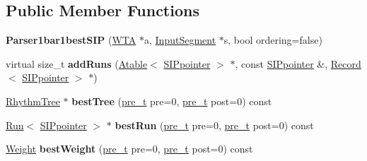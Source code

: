 \subsection*{Public Member Functions}
\begin{DoxyCompactItemize}
\item 
\mbox{\label{classParser1bar1bestSIP_a8827aebf49c21d943c8f61cd96237133}} 
{\bfseries Parser1bar1best\+S\+IP} (\mbox{\hyperlink{classWTA}{W\+TA}} $\ast$a, \mbox{\hyperlink{classInputSegment}{Input\+Segment}} $\ast$s, bool ordering=false)
\item 
\mbox{\label{classParser1bar1bestSIP_a17d10685cd81fb445dc413405be224c1}} 
virtual size\+\_\+t {\bfseries add\+Runs} (\mbox{\hyperlink{classAtable}{Atable}}$<$ \mbox{\hyperlink{classSIPpointer}{S\+I\+Ppointer}} $>$ $\ast$, const \mbox{\hyperlink{classSIPpointer}{S\+I\+Ppointer}} \&, \mbox{\hyperlink{classRecord}{Record}}$<$ \mbox{\hyperlink{classSIPpointer}{S\+I\+Ppointer}} $>$ $\ast$)
\item 
\mbox{\label{classParser1bar1bestSIP_a763e3b8bc64ada7de81b5f76f063a24e}} 
\mbox{\hyperlink{classRhythmTree}{Rhythm\+Tree}} $\ast$ {\bfseries best\+Tree} (\mbox{\hyperlink{group__general_ga092fe8b972dfa977c2a0886720a7731e}{pre\+\_\+t}} pre=0, \mbox{\hyperlink{group__general_ga092fe8b972dfa977c2a0886720a7731e}{pre\+\_\+t}} post=0) const
\item 
\mbox{\label{classParser1bar1bestSIP_a4ed9a27a25fa6fe5267442264ac29c7f}} 
\mbox{\hyperlink{classRun}{Run}}$<$ \mbox{\hyperlink{classSIPpointer}{S\+I\+Ppointer}} $>$ $\ast$ {\bfseries best\+Run} (\mbox{\hyperlink{group__general_ga092fe8b972dfa977c2a0886720a7731e}{pre\+\_\+t}} pre=0, \mbox{\hyperlink{group__general_ga092fe8b972dfa977c2a0886720a7731e}{pre\+\_\+t}} post=0) const
\item 
\mbox{\label{classParser1bar1bestSIP_a4add4bdf01c1ff016bc66c8cf72d61fd}} 
\mbox{\hyperlink{classWeight}{Weight}} {\bfseries best\+Weight} (\mbox{\hyperlink{group__general_ga092fe8b972dfa977c2a0886720a7731e}{pre\+\_\+t}} pre=0, \mbox{\hyperlink{group__general_ga092fe8b972dfa977c2a0886720a7731e}{pre\+\_\+t}} post=0) const
\item 
\mbox{\label{classParser1bar1bestSIP_ad71468f650393d9741029aeb7d16c8e6}} 

\end{DoxyCompactItemize}
